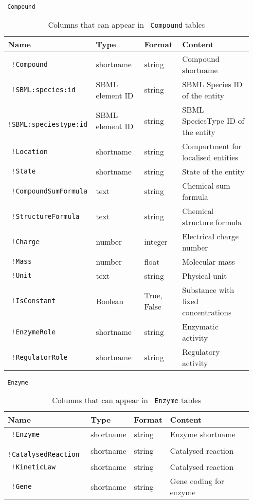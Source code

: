 \documentclass[a4paper]{article}
\newcommand{\tab}[1]{{\texttt{\color{red} #1}}}
\newcommand{\col}[1]{\texttt{\color{blue} #1}}
\begin{document}
\begin{appendix}
\begin{table}[h!]
\tab{Compound}\\
\begin{tabular}{|l|l|l|l|}
\hline
Name & Type & Format & Content \\
\hline
  \col{!Compound}   			& shortname 		& string 		& Compound shortname\\
  \col{!SBML:species:id}   		& SBML element ID	& string		& SBML Species ID of the entity \\
  \col{!SBML:speciestype:id}	& SBML element ID 	& string		& SBML SpeciesType ID of the entity \\
  \col{!Location} 				& shortname 		& string 		& Compartment for localised entities\\
  \col{!State}    				& shortname 		& string		& State of the entity \\
  \col{!CompoundSumFormula}     & text 				& string 		& Chemical sum formula \\
  \col{!StructureFormula} 		& text 				& string 		& Chemical structure formula \\
  \col{!Charge}  				& number 			& integer		& Electrical charge number \\
  \col{!Mass}					& number 			& float 		& Molecular mass \\
  \col{!Unit} 					& text 				& string 		& Physical unit\\
  \col{!IsConstant}       		& Boolean 			& True, False 	& Substance with fixed concentrations\\
  \col{!EnzymeRole}  	  		& shortname 		& string		& Enzymatic activity \\
  \col{!RegulatorRole}  	 	& shortname 		& string		& Regulatory activity \\
\hline
\end{tabular}
\caption{Columns that can appear in \tab{Compound} tables}
\label{tab:columnsalltables}
\end{table}

\begin{table}[h!]
\tab{Enzyme}\\
\begin{tabular}{|l|l|l|l|}
  \hline
  Name & Type & Format & Content \\
  \hline
  \col{!Enzyme} 			& shortname & string & Enzyme shortname\\
  \col{!CatalysedReaction}	& shortname & string & Catalysed reaction \\
  \col{!KineticLaw} 		& shortname & string & Catalysed reaction \\
  \col{!Gene}  				& shortname & string & Gene coding for enzyme\\
  \hline
\end{tabular}
\caption{Columns that can appear in \tab{Enzyme} tables}
\label{tab:columnsentities1}
\end{table}


\end{appendix}
\end{document}
